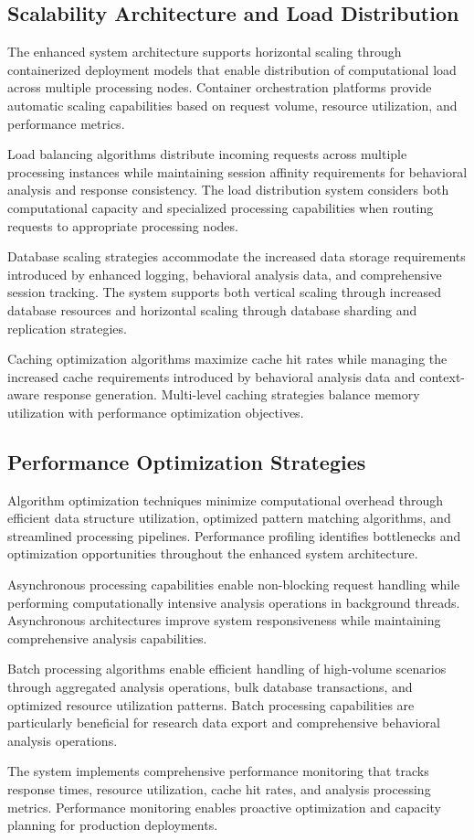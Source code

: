 \subsection{Scalability Architecture and Load Distribution}

The enhanced system architecture supports horizontal scaling through containerized deployment models that enable distribution of computational load across multiple processing nodes. Container orchestration platforms provide automatic scaling capabilities based on request volume, resource utilization, and performance metrics.

Load balancing algorithms distribute incoming requests across multiple processing instances while maintaining session affinity requirements for behavioral analysis and response consistency. The load distribution system considers both computational capacity and specialized processing capabilities when routing requests to appropriate processing nodes.

Database scaling strategies accommodate the increased data storage requirements introduced by enhanced logging, behavioral analysis data, and comprehensive session tracking. The system supports both vertical scaling through increased database resources and horizontal scaling through database sharding and replication strategies.

Caching optimization algorithms maximize cache hit rates while managing the increased cache requirements introduced by behavioral analysis data and context-aware response generation. Multi-level caching strategies balance memory utilization with performance optimization objectives.

\subsection{Performance Optimization Strategies}

Algorithm optimization techniques minimize computational overhead through efficient data structure utilization, optimized pattern matching algorithms, and streamlined processing pipelines. Performance profiling identifies bottlenecks and optimization opportunities throughout the enhanced system architecture.

Asynchronous processing capabilities enable non-blocking request handling while performing computationally intensive analysis operations in background threads. Asynchronous architectures improve system responsiveness while maintaining comprehensive analysis capabilities.

Batch processing algorithms enable efficient handling of high-volume scenarios through aggregated analysis operations, bulk database transactions, and optimized resource utilization patterns. Batch processing capabilities are particularly beneficial for research data export and comprehensive behavioral analysis operations.

The system implements comprehensive performance monitoring that tracks response times, resource utilization, cache hit rates, and analysis processing metrics. Performance monitoring enables proactive optimization and capacity planning for production deployments.